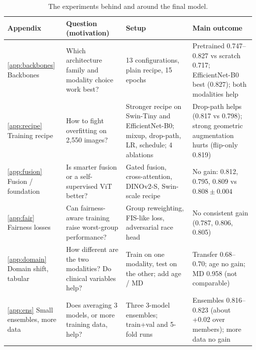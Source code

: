 \documentclass[11pt]{article}
\begin{document}
\begin{table}[h]
\centering\footnotesize
\begin{tabular}{p{2.1cm}p{4.2cm}p{4.4cm}p{3.9cm}}
\toprule
Appendix & Question (motivation) & Setup & Main outcome \\
\midrule
\ref{app:backbones} Backbones & Which architecture family and modality choice work best? & 13 configurations, plain recipe, 15 epochs & Pretrained 0.747--0.827 vs scratch 0.717; EfficientNet-B0 best (0.827); both modalities help \\
\ref{app:recipe} Training recipe & How to fight overfitting on 2{,}550 images? & Stronger recipe on Swin-Tiny and EfficientNet-B0; mixup, drop-path, LR, schedule; 4 ablations & Drop-path helps (0.817 vs 0.798); strong geometric augmentation hurts (flip-only 0.819) \\
\ref{app:fusion} Fusion / foundation & Is smarter fusion or a self-supervised ViT better? & Gated fusion, cross-attention, DINOv2-S, Swin-scale recipe & No gain: 0.812, 0.795, 0.809 vs $0.808\pm0.004$ \\
\ref{app:fair} Fairness losses & Can fairness-aware training raise worst-group performance? & Group reweighting, FIS-like loss, adversarial race head & No consistent gain (0.787, 0.806, 0.805) \\
\ref{app:domain} Domain shift, tabular & How different are the two modalities? Do clinical variables help? & Train on one modality, test on the other; add age / MD & Transfer 0.68--0.70; age no gain; MD 0.958 (not comparable) \\
\ref{app:ens} Small ensembles, more data & Does averaging 3 models, or more training data, help? & Three 3-model ensembles; train+val and 5-fold runs & Ensembles 0.816--0.823 (about +0.02 over members); more data no gain \\
\bottomrule
\end{tabular}
\caption{The experiments behind and around the final model.}
\label{tab:overview}
\end{table}

\end{document}
